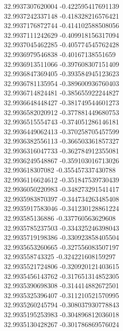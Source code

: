 {32.9937307620004	-0.422595417691139\\
32.9937242337148	-0.418328216576421\\
32.9937176872744	-0.414102588508056\\
32.9937111242629	-0.409918156317094\\
32.9937045462285	-0.405774545762428\\
32.9936979546838	-0.40167138551659\\
32.9936913511066	-0.397608307151409\\
32.9936847369405	-0.393584945123623\\
32.9936781135954	-0.389600936760403\\
32.9936714824481	-0.385655922244827\\
32.9936648448427	-0.381749544601273\\
32.9936582020912	-0.377881449680753\\
32.9936515554743	-0.374051286146181\\
32.9936449062413	-0.370258705457599\\
32.9936382556113	-0.366503361857327\\
32.9936316047733	-0.362784912355081\\
32.9936249548867	-0.359103016713026\\
32.993618307082	-0.355457337430788\\
32.9936116624612	-0.351847539730439\\
32.9936050220983	-0.348273291541417\\
32.9935983870397	-0.344734263485408\\
32.9935917583046	-0.341230128861224\\
32.993585136886	-0.337760563629608\\
32.9935785237503	-0.334325246398043\\
32.9935719198386	-0.330923858405504\\
32.9935653260665	-0.327556083507197\\
32.993558743325	-0.324221608159297\\
32.9935521724806	-0.320920121403615\\
32.9935456143762	-0.317651314852305\\
32.9935390698308	-0.314414882672501\\
32.9935325396407	-0.311210521570995\\
32.9935260245794	-0.308037930778843\\
32.9935195253983	-0.304896812036018\\
32.9935130428267	-0.301786869576024\\
}

